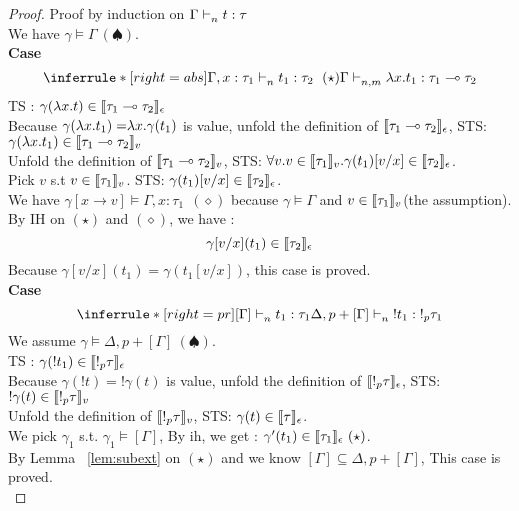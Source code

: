 \documentclass{article}
\begin{document}
 \begin{proof}  Proof by induction on  $\Gamma \mathrel{\vdash_{n}^{} {t} : {\tau}} $\\
 We have $ \gamma \vDash \Gamma ~(\spadesuit) $. \\
   \noindent \textbf{Case} 
 \[
 \inferrule*[right = abs]
   {\Gamma, x: \tau_1 \jtype{n}{}{t_1}{\tau_2}~(\star)}
   { \Gamma \jtype{n,m}{}{\abs{x}{t_1}}{\tau_1 \multimap \tau_2}  }
 \]
 TS : $ \gamma(\mathrel { \lambda {x} . {t} }) \in \llbracket {\tau_1 \multimap \tau_2} \rrbracket_{\epsilon} $ \\
 Because $\gamma(\mathrel { \lambda {x} . {t_1} }) =\mathrel { \lambda {x} . {\gamma(t_1)} } $ is value, unfold the definition of $\llbracket {\tau_1 \multimap \tau_2} \rrbracket_{\epsilon}$, STS: $ \gamma(\mathrel { \lambda {x} . {t_1} }) \in \llbracket {\tau_1 \multimap \tau_2} \rrbracket_{v} $\\
 Unfold the definition of $\llbracket {\tau_1 \multimap \tau_2} \rrbracket_{v}$, STS: $\forall v. v \in \llbracket {\tau_1} \rrbracket_{v}. \gamma(t_1)[v/x] \in \llbracket {\tau_2} \rrbracket_{\epsilon}  $.\\
 Pick $v$ s.t $ v \in \llbracket {\tau_1} \rrbracket_{v}$. STS: $\gamma(t_1)[v/x] \in \llbracket {\tau_2} \rrbracket_{\epsilon} $.\\
 We have $\gamma[x \rightarrow v] \vDash \Gamma, x: \tau_1 \ \ (\diamond) $ because $\gamma \vDash \Gamma$ and $ v \in \llbracket {\tau_1} \rrbracket_{v} $(the assumption). \\
 By IH on $(\star)$ and $(\diamond)$, we have : \\
   $$ \gamma[v/x](t_1) \in \llbracket {\tau_2} \rrbracket_{\epsilon}  $$
 Because $\gamma[v/x] (t_1) =  \gamma(t_1[v/x])$, this case is proved.\\
 
 \noindent \textbf{Case} 
 \[
 \inferrule*[right = pr]
   {[\Gamma] \jtype{n}{}{t_1}{\tau_1}}
   {\Delta, p + [\Gamma] \jtype{n}{}{!t_1}{!_p \tau_1}  }
 \]
 We assume $ \gamma \vDash \Delta, p+[\Gamma] ~(\spadesuit) $. \\
 TS : $ \gamma(!t_1) \in \llbracket {!_p \tau} \rrbracket_{\epsilon} $ \\
 Because $\gamma ( !t)= ! \gamma(t) $ is value, unfold the definition of $\llbracket {!_p \tau} \rrbracket_{\epsilon}$, STS: $ ! \gamma(t) \in \llbracket {!_p \tau} \rrbracket_{v} $\\
 Unfold the definition of $\llbracket {!_p \tau} \rrbracket_{v} $, STS: $\gamma (t) \in \llbracket {\tau} \rrbracket_{\epsilon}$. \\
 We pick $\gamma_1$ s.t. $\gamma_1 \vDash [\Gamma] $, By ih, we get : $\gamma'(t_1) \in \llu{\tau_1}{\epsilon} ~(\star) $.\\
 By Lemma ~\ref{lem:subext} on $(\star)$ and we know $ [\Gamma] \subseteq \Delta,p+[\Gamma] $, This case is proved.\\
 

\end{proof}
\end{document}
